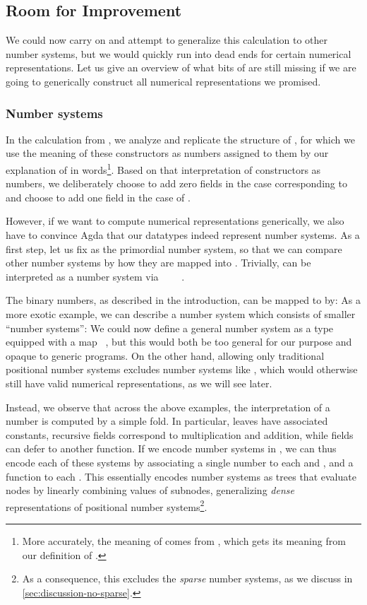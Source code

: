 \subsection{Room for Improvement}
We could now carry on and attempt to generalize this calculation to other number systems, but we would quickly run into dead ends for certain numerical representations. Let us give an overview of what bits of  are still missing if we are going to generically construct all numerical representations we promised.

\subsubsection{Number systems}\label{ssec:numbers}
In the calculation  from \bN{}, we analyze and replicate the structure of \bN{}, for which we use the meaning of these constructors as numbers assigned to them by our explanation of \bN{} in words\footnote{More accurately, the meaning of \bN{} comes from , which gets its meaning from our definition of \AF{\_<\_}.}. Based on that interpretation of constructors as numbers, we deliberately choose to add zero fields in the case corresponding to  and choose to add one field in the case of .

However, if we want to compute numerical representations generically, we also have to convince Agda that our datatypes indeed represent number systems. As a first step, let us fix \bN{} as the primordial number system, so that we can compare other number systems by how they are mapped into \bN{}. Trivially, \bN{} can be interpreted as a number system via \ \AV{:}\ \bN{}\ \ \bN{}.

The binary numbers, as described in the introduction, can be mapped to \bN{} by:
As a more exotic example, we can describe a number system
which consists of smaller ``number systems'':
We could now define a general number system as a type  equipped with a map \ \bN{}, but this would both be too general for our purpose and opaque to generic programs. On the other hand, allowing only traditional positional number systems excludes number systems like , which would otherwise still have valid numerical representations, as we will see later.

Instead, we observe that across the above examples, the interpretation of a number is computed by a simple fold. In particular, leaves have associated constants, recursive fields correspond to multiplication and addition, while fields can defer to another function. If we encode number systems in , we can thus encode each of these systems by associating a single number to each  and , and a function to each . This essentially encodes number systems as trees that evaluate nodes by linearly combining values of subnodes, generalizing \emph{dense} representations of positional number systems\footnote{As a consequence, this excludes the \emph{sparse} number systems, as we discuss in \autoref{sec:discussion-no-sparse}.}.

